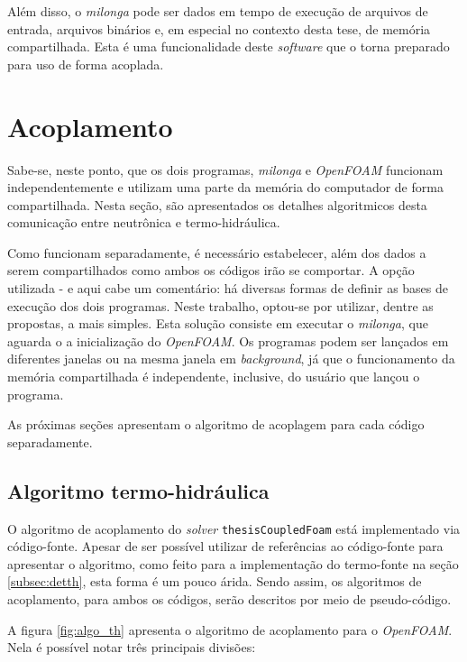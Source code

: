 Além disso, o \textit{milonga} pode ser dados em tempo de execução de arquivos de
entrada, arquivos binários e, em especial no contexto desta tese, de memória compartilhada.
Esta é uma funcionalidade deste \textit{software} que o torna preparado para uso de
forma acoplada.


\section{Acoplamento}
\label{sec:acoplamento}

Sabe-se, neste ponto, que os dois programas, \textit{milonga} e \textit{OpenFOAM} funcionam
independentemente e utilizam uma parte da memória do computador de forma compartilhada.
Nesta seção, são apresentados os detalhes algoritmicos desta comunicação entre neutrônica e
termo-hidráulica.

Como funcionam separadamente, é necessário estabelecer, além dos dados a serem compartilhados
como ambos os códigos irão se comportar. A opção utilizada - e aqui cabe um comentário: há diversas
formas de definir as bases de execução dos dois programas. Neste trabalho, optou-se por utilizar,
dentre as propostas, a mais simples. Esta solução consiste em executar o \textit{milonga}, que aguarda
o a inicialização do \textit{OpenFOAM}. Os programas podem ser lançados em diferentes janelas ou
na mesma janela em \textit{background}, já que o funcionamento da memória compartilhada é independente,
inclusive, do usuário que lançou o programa.

As próximas seções apresentam o algoritmo de acoplagem para cada código separadamente.



\subsection{Algoritmo termo-hidráulica}
\label{subsec:th}

O algoritmo de acoplamento do \textit{solver} \texttt{thesisCoupledFoam} está implementado
via código-fonte. Apesar de ser possível utilizar de referências ao código-fonte para
apresentar o algoritmo, como feito para a implementação do termo-fonte na seção \ref{subsec:detth},
esta forma é um pouco árida. Sendo assim, os algoritmos de acoplamento, para ambos os códigos,
serão descritos por meio de pseudo-código.

A figura \ref{fig:algo_th} apresenta o algoritmo de acoplamento para o \textit{OpenFOAM}. Nela é
possível notar três principais divisões:

